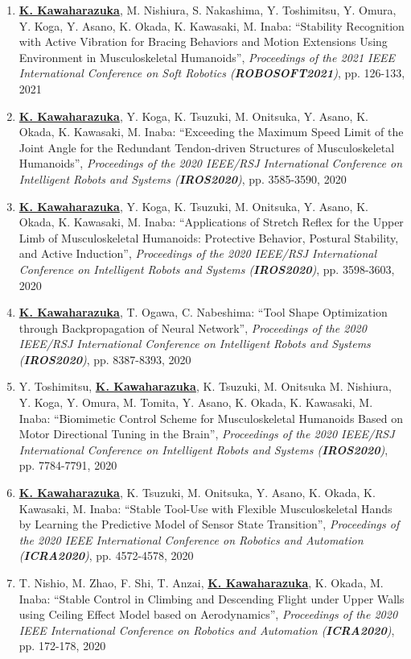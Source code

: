 \documentclass[letterpaper]{article}
\begin{document}
\begin{enumerate}
\item \underline{\textbf{K. Kawaharazuka}}, M. Nishiura, S. Nakashima, Y. Toshimitsu, Y. Omura, Y. Koga, Y. Asano, K. Okada, K. Kawasaki, M. Inaba: ``Stability Recognition with Active Vibration for Bracing Behaviors and Motion Extensions Using Environment in Musculoskeletal Humanoids'', \textit{Proceedings of the 2021 IEEE International Conference on Soft Robotics (\textit{\textbf{ROBOSOFT2021}})}, pp. 126-133, 2021
\item \underline{\textbf{K. Kawaharazuka}}, Y. Koga, K. Tsuzuki, M. Onitsuka, Y. Asano, K. Okada, K. Kawasaki, M. Inaba: ``Exceeding the Maximum Speed Limit of the Joint Angle for the Redundant Tendon-driven Structures of Musculoskeletal Humanoids'', \textit{Proceedings of the 2020 IEEE/RSJ International Conference on Intelligent Robots and Systems (\textit{\textbf{IROS2020}})}, pp. 3585-3590, 2020
\item \underline{\textbf{K. Kawaharazuka}}, Y. Koga, K. Tsuzuki, M. Onitsuka, Y. Asano, K. Okada, K. Kawasaki, M. Inaba: ``Applications of Stretch Reflex for the Upper Limb of Musculoskeletal Humanoids: Protective Behavior, Postural Stability, and Active Induction'', \textit{Proceedings of the 2020 IEEE/RSJ International Conference on Intelligent Robots and Systems (\textit{\textbf{IROS2020}})}, pp. 3598-3603, 2020
\item \underline{\textbf{K. Kawaharazuka}}, T. Ogawa, C. Nabeshima: ``Tool Shape Optimization through Backpropagation of Neural Network'', \textit{Proceedings of the 2020 IEEE/RSJ International Conference on Intelligent Robots and Systems (\textit{\textbf{IROS2020}})}, pp. 8387-8393, 2020
\item Y. Toshimitsu, \underline{\textbf{K. Kawaharazuka}}, K. Tsuzuki, M. Onitsuka M. Nishiura, Y. Koga, Y. Omura, M. Tomita, Y. Asano, K. Okada, K. Kawasaki, M. Inaba: ``Biomimetic Control Scheme for Musculoskeletal Humanoids Based on Motor Directional Tuning in the Brain'', \textit{Proceedings of the 2020 IEEE/RSJ International Conference on Intelligent Robots and Systems (\textit{\textbf{IROS2020}})}, pp. 7784-7791, 2020
\item \underline{\textbf{K. Kawaharazuka}}, K. Tsuzuki, M. Onitsuka, Y. Asano, K. Okada, K. Kawasaki, M. Inaba: ``Stable Tool-Use with Flexible Musculoskeletal Hands by Learning the Predictive Model of Sensor State Transition'', \textit{Proceedings of the 2020 IEEE International Conference on Robotics and Automation (\textit{\textbf{ICRA2020}})}, pp. 4572-4578, 2020
\item T. Nishio, M. Zhao, F. Shi, T. Anzai, \underline{\textbf{K. Kawaharazuka}}, K. Okada, M. Inaba: ``Stable Control in Climbing and Descending Flight under Upper Walls using Ceiling Effect Model based on Aerodynamics'', \textit{Proceedings of the 2020 IEEE International Conference on Robotics and Automation (\textit{\textbf{ICRA2020}})}, pp. 172-178, 2020

\end{enumerate}
\end{document}
